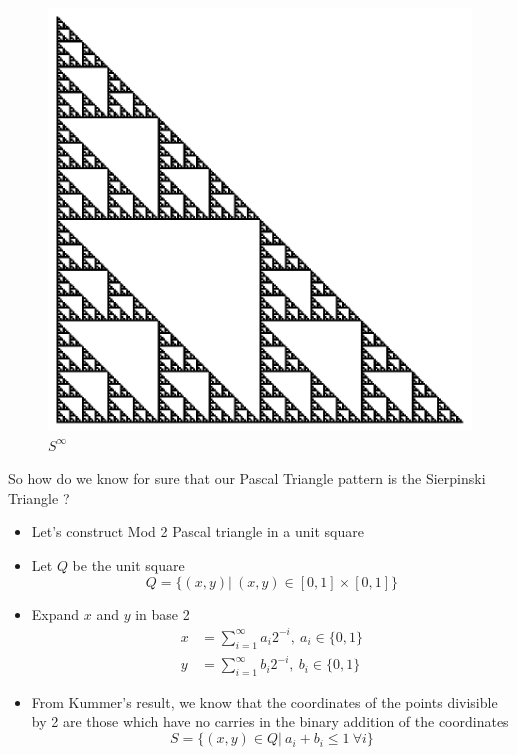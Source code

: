 \documentclass{beamer}
\begin{document}
\begin{frame}
    \begin{figure}
        \centering
        \includegraphics[scale=0.5]{GlobalMod2}
        \caption{$S^\infty$}
    \end{figure}
\end{frame}

\begin{frame}
    \centering
    So how do we know for sure that our Pascal Triangle pattern is the Sierpinski Triangle ?
\end{frame}
\begin{frame}
    \begin{itemize}
        \item Let's construct Mod 2 Pascal triangle in a unit square
        \item Let $Q$ be the unit square 
        \begin{equation*}
            Q = \{(x,y) | \ (x,y) \in [0,1] \times [0,1]\}
        \end{equation*}
        \item Expand $x$ and $y$ in base 2
        \begin{align*}
            x &= \sum_{i=1}^\infty a_i 2^{-i}, \ a_i \in \{0,1\} \\
            y &= \sum_{i=1}^\infty b_i 2^{-i}, \ b_i \in \{0,1\}
        \end{align*}
        \item From Kummer's result, we know that the coordinates of the points divisible by 2 are those which have no carries in the binary addition of the coordinates
        \begin{equation*}
            S = \{(x,y) \in Q| \ a_i + b_i \leq 1 \ \forall i\}
        \end{equation*} 
    \end{itemize}
\end{frame}
\end{document}

